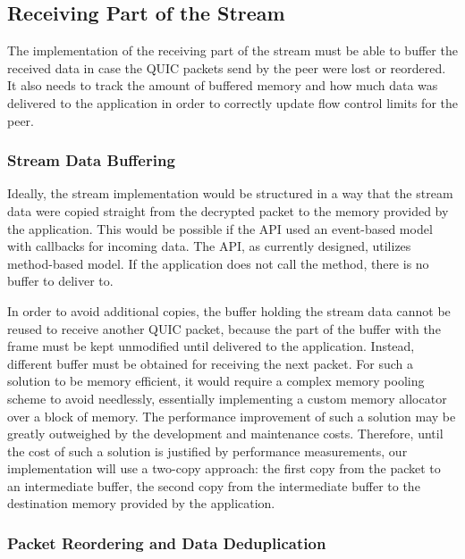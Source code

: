 \subsection{Receiving Part of the Stream}

The implementation of the receiving part of the stream must be able to buffer the received data in
case the QUIC packets send by the peer were lost or reordered. It also needs to track the amount of
buffered memory and how much data was delivered to the application in order to correctly update flow
control limits for the peer.

\subsubsection{Stream Data Buffering}

Ideally, the stream implementation would be structured in a way that the stream data were copied
straight from the decrypted packet to the memory provided by the application. This would be possible
if the API used an event-based model with callbacks for incoming data. The API, as currently
designed, utilizes method-based model. If the application does not call the 
method, there is no buffer to deliver to.

In order to avoid additional copies, the buffer holding the stream data cannot be reused to receive
another QUIC packet, because the part of the buffer with the \STREAM{} frame must be kept unmodified
until delivered to the application. Instead, different buffer must be obtained for receiving the
next packet. For such a solution to be memory efficient, it would require a complex memory pooling
scheme to avoid needlessly, essentially implementing a custom memory allocator over a block of
memory. The performance improvement of such a solution may be greatly outweighed by the development
and maintenance costs. Therefore, until the cost of such a solution is justified by performance
measurements, our implementation will use a two-copy approach: the first copy from the packet to an
intermediate buffer, the second copy from the intermediate buffer to the destination memory provided
by the application.




\subsubsection{Packet Reordering and Data Deduplication}

